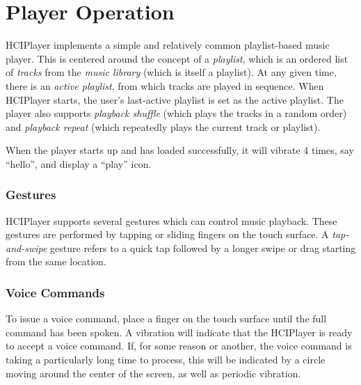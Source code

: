 \documentclass[12pt,letterpaper]{article}
\begin{document}
\section{Player Operation}
	
HCIPlayer implements a simple and relatively common playlist-based music player. This is centered around the concept of a \emph{playlist}, which is an ordered list of \emph{tracks} from the \emph{music library} (which is itself a playlist). At any given time, there is an \emph{active playlist}, from which tracks are played in sequence. When HCIPlayer starts, the user's last-active playlist is set as the active playlist. The player also supports \emph{playback shuffle} (which plays the tracks in a random order) and \emph{playback repeat} (which repeatedly plays the current track or playlist).

When the player starts up and has loaded successfully, it will vibrate 4 times, {\color{magenta} say ``hello''}, and display a ``play'' icon.


\subsubsection*{Gestures}
HCIPlayer supports several gestures which can control music playback. These gestures are performed by tapping or sliding fingers on the touch surface. A \emph{tap-and-swipe} gesture refers to a quick tap followed by a longer swipe or drag starting from the same location.
\subsubsection*{Voice Commands}
To issue a voice command, place a finger on the touch surface until the full command has been spoken. A vibration will indicate that the HCIPlayer is ready to accept a voice command. If, for some reason or another, the voice command is taking a particularly long time to process, {\color{magenta}this will be indicated by a circle moving around the center of the screen}, as well as periodic vibration.
\end{document}
